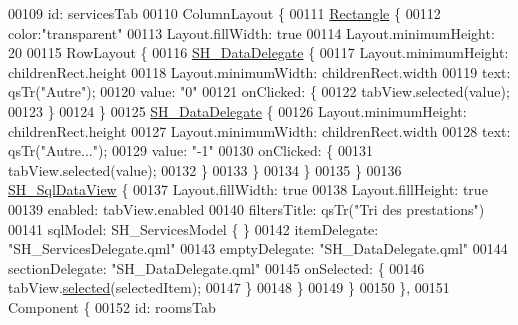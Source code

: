 \begin{DoxyCode}
00109             \textcolor{keywordtype}{id}: servicesTab
00110             ColumnLayout \{
00111                 \hyperlink{classRectangle}{Rectangle} \{
00112                     color:\textcolor{stringliteral}{"transparent"}
00113                     Layout.fillWidth: \textcolor{keyword}{true}
00114                     Layout.minimumHeight: 20
00115                     RowLayout \{
00116                         \hyperlink{classSH__DataDelegate}{SH\_DataDelegate} \{
00117                             Layout.minimumHeight: childrenRect.height
00118                             Layout.minimumWidth: childrenRect.width
00119                             text: qsTr(\textcolor{stringliteral}{"Autre"});
00120                             value: \textcolor{stringliteral}{"0"}
00121                             onClicked: \{
00122                                 tabView.selected(value);
00123                             \}
00124                         \}
00125                         \hyperlink{classSH__DataDelegate}{SH\_DataDelegate} \{
00126                             Layout.minimumHeight: childrenRect.height
00127                             Layout.minimumWidth: childrenRect.width
00128                             text: qsTr(\textcolor{stringliteral}{"Autre..."});
00129                             value: \textcolor{stringliteral}{"-1"}
00130                             onClicked: \{
00131                                 tabView.selected(value);
00132                             \}
00133                         \}
00134                     \}
00135                 \}
00136                 \hyperlink{classSH__SqlDataView}{SH\_SqlDataView} \{
00137                     Layout.fillWidth: \textcolor{keyword}{true}
00138                     Layout.fillHeight: \textcolor{keyword}{true}
00139                     enabled: tabView.enabled
00140                     filtersTitle: qsTr(\textcolor{stringliteral}{"Tri des prestations"})
00141                     sqlModel: SH\_ServicesModel \{ \}
00142                     itemDelegate: \textcolor{stringliteral}{"SH\_ServicesDelegate.qml"}
00143                     emptyDelegate: \textcolor{stringliteral}{"SH\_DataDelegate.qml"}
00144                     sectionDelegate: \textcolor{stringliteral}{"SH\_DataDelegate.qml"}
00145                     onSelected: \{
00146                         tabView.\hyperlink{classSH__SqlDataView_a95366e3f65b183e8c82381e90b5ddc94}{selected}(selectedItem);
00147                     \}
00148                 \}
00149             \}
00150         \},
00151         Component \{
00152             \textcolor{keywordtype}{id}: roomsTab

\end{DoxyCode}
